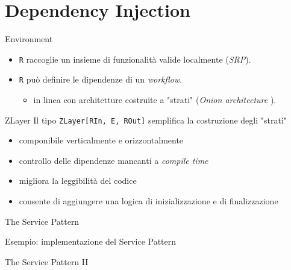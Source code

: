 \section{Dependency Injection}
\begin{frame}{}
  \begin{block}{Environment}
    \vspace{2mm}
    \begin{itemize}
      \item \texttt{R} raccoglie un insieme di funzionalità valide localmente (\small{\textit{SRP}}).
      \item \texttt{R} può definire le dipendenze di un \textit{workflow}.
      \begin{itemize}
        \item in linea con architetture costruite a "strati" (\textit{Onion architecture} ).
      \end{itemize} 
    \end{itemize}
  \end{block}

  \begin{block}{ZLayer}
    Il tipo \texttt{ZLayer[RIn, E, ROut]} semplifica la costruzione degli "strati"
    \begin{itemize}
      \item componibile verticalmente e orizzontalmente
      \item controllo delle dipendenze mancanti a \textit{compile time}
      \item migliora la leggibilità del codice
      \item consente di aggiungere una logica di inizializzazione e di finalizzazione
    \end{itemize}

  \end{block}
  
\end{frame}

\begin{frame}{The Service Pattern}
  \begin{block}{Esempio: implementazione del Service Pattern}
    
  \end{block}
\end{frame}

\begin{frame}{The Service Pattern II}
  \begin{block}{}
    
  \end{block}
  \pause
  \begin{alertblock}{}
    
  \end{alertblock}
  \pause
  \begin{exampleblock}{}
    
  \end{exampleblock}
\end{frame}